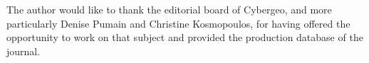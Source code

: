 
\begin{acknowledgements}
The author would like to thank the editorial board of Cybergeo, and more particularly Denise Pumain and Christine Kosmopoulos, for having offered the opportunity to work on that subject and provided the production database of the journal. 
\end{acknowledgements}
























